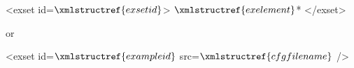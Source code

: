 <exset id=$\xmlstructref{exsetid}$>
  $\xmlstructref{exelement}$*
</exset>

or

<exset id=$\xmlstructref{exampleid}$ src=$\xmlstructref{cfgfilename}$ />
